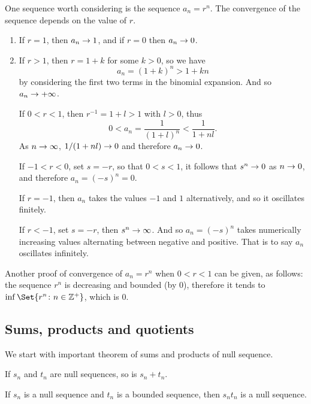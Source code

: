 \documentclass[main.tex]{subfiles}
\begin{document}
	One sequence worth considering is the sequence $a_n = r^n$. The convergence of the sequence depends on the value of $r$.
	\begin{enumerate}
		\item If $r = 1$, then $a_n \rightarrow 1$, and if $r = 0$ then $a_n \rightarrow 0$.
		
		\item If $r > 1$, then $r = 1 + k$ for some $k > 0$, so we have
		\begin{equation*}
		a_n = \left(1 + k\right)^n > 1 + kn
		\end{equation*}
		by considering the first two terms in the binomial expansion. And so $a_n \rightarrow +\infty$.
		
		\ii If $0 < r < 1$, then $r^{-1} = 1 + l > 1$ with $l > 0$, thus
		\begin{equation*}
			0 < a_n = \frac{1}{\left(1 + l\right)^n} < \frac{1}{1 + nl}.
		\end{equation*}
		As $n \rightarrow \infty$, $1/(1 + nl) \rightarrow 0$ and therefore $a_n \rightarrow 0$.
		
		\ii If $-1 < r < 0$, set $s = -r$, so that $0 < s < 1$, it follows that $s^n \rightarrow 0$ as $n \rightarrow 0$, and therefore $a_n = (-s)^n = 0$.
		
		\ii If $r = -1$, then $a_n$ takes the values $-1$ and $1$ alternatively, and so it oscillates finitely.
		
		\ii If $r < -1$, set $s = -r$, then $s^n \rightarrow \infty$. And so $a_n = (-s)^n$ takes numerically increasing values alternating between negative and positive. That is to say $a_n$ oscillates infinitely.
 	\end{enumerate}
	Another proof of convergence of $a_n = r^n$ when $0 < r < 1$ can be given, as follows: the sequence $r^n$ is decreasing and bounded (by 0), therefore it tends to $\inf\Set{r^n \colon n \in \ZZ^{+}}$, which is 0.
		
	\subsection{Sums, products and quotients}
	We start with important theorem of sums and products of null sequence.
	\begin{theorem}
		If $s_n$ and $t_n$ are null sequences, so is $s_n + t_n$.
	\end{theorem}
	
	\begin{theorem}
		If $s_n$ is a null sequence and $t_n$ is a bounded sequence, then $s_n t_n$ is a null sequence.
	\end{theorem}
	
\end{document}
